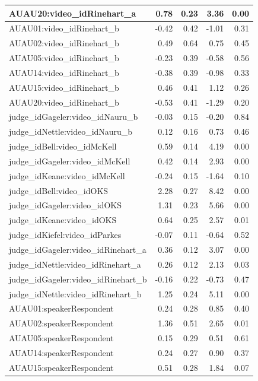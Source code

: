 \documentclass{monashthesis}
\begin{document}
\begin{tabular}{l|r|r|r|r}
\hline
AUAU20:video\_idRinehart\_a & 0.78 & 0.23 & 3.36 & 0.00\\
\hline
AUAU01:video\_idRinehart\_b & -0.42 & 0.42 & -1.01 & 0.31\\
\hline
AUAU02:video\_idRinehart\_b & 0.49 & 0.64 & 0.75 & 0.45\\
\hline
AUAU05:video\_idRinehart\_b & -0.23 & 0.39 & -0.58 & 0.56\\
\hline
AUAU14:video\_idRinehart\_b & -0.38 & 0.39 & -0.98 & 0.33\\
\hline
AUAU15:video\_idRinehart\_b & 0.46 & 0.41 & 1.12 & 0.26\\
\hline
AUAU20:video\_idRinehart\_b & -0.53 & 0.41 & -1.29 & 0.20\\
\hline
judge\_idGageler:video\_idNauru\_b & -0.03 & 0.15 & -0.20 & 0.84\\
\hline
judge\_idNettle:video\_idNauru\_b & 0.12 & 0.16 & 0.73 & 0.46\\
\hline
judge\_idBell:video\_idMcKell & 0.59 & 0.14 & 4.19 & 0.00\\
\hline
judge\_idGageler:video\_idMcKell & 0.42 & 0.14 & 2.93 & 0.00\\
\hline
judge\_idKeane:video\_idMcKell & -0.24 & 0.15 & -1.64 & 0.10\\
\hline
judge\_idBell:video\_idOKS & 2.28 & 0.27 & 8.42 & 0.00\\
\hline
judge\_idGageler:video\_idOKS & 1.31 & 0.23 & 5.66 & 0.00\\
\hline
judge\_idKeane:video\_idOKS & 0.64 & 0.25 & 2.57 & 0.01\\
\hline
judge\_idKiefel:video\_idParkes & -0.07 & 0.11 & -0.64 & 0.52\\
\hline
judge\_idGageler:video\_idRinehart\_a & 0.36 & 0.12 & 3.07 & 0.00\\
\hline
judge\_idNettle:video\_idRinehart\_a & 0.26 & 0.12 & 2.13 & 0.03\\
\hline
judge\_idGageler:video\_idRinehart\_b & -0.16 & 0.22 & -0.73 & 0.47\\
\hline
judge\_idNettle:video\_idRinehart\_b & 1.25 & 0.24 & 5.11 & 0.00\\
\hline
AUAU01:speakerRespondent & 0.24 & 0.28 & 0.85 & 0.40\\
\hline
AUAU02:speakerRespondent & 1.36 & 0.51 & 2.65 & 0.01\\
\hline
AUAU05:speakerRespondent & 0.15 & 0.29 & 0.51 & 0.61\\
\hline
AUAU14:speakerRespondent & 0.24 & 0.27 & 0.90 & 0.37\\
\hline
AUAU15:speakerRespondent & 0.51 & 0.28 & 1.84 & 0.07\\

\end{tabular}
\end{document}
